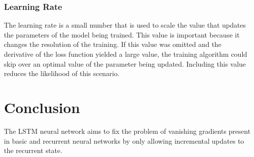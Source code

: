 \documentclass[12pt]{article}
\begin{document}
\subsubsection{Learning Rate}

The learning rate is a small number that is used to scale the value that
updates the parameters of the model being trained. This value is important
because it changes the resolution of the training. If this value was omitted
and the derivative of the loss function yielded a large value, the training
algorithm could skip over an optimal value of the parameter being updated.
Including this value reduces the likelihood of this scenario.

\section{Conclusion}
The LSTM neural network aims to fix the problem of vanishing gradients present
in basic and recurrent neural networks by only allowing incremental updates to
the recurrent state.
\end{document}
